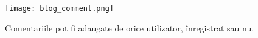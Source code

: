 \documentclass[11pt]{scrartcl} %
\begin{document}
\begin{figure}[h] %
	\centering
	\texttt{[image: blog\_comment.png]} %
	\caption{Comentariile pot fi adaugate de orice utilizator, înregistrat sau nu. }
	\label{fig:blog_comment}
\end{figure}

\end{document}
